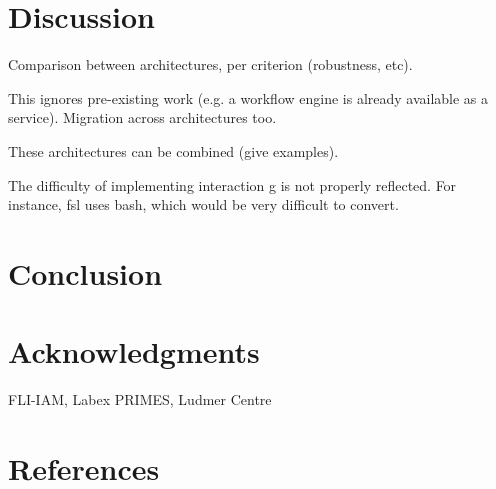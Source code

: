 \documentclass[preprint,3p,twocolumn]{elsarticle}
\begin{document}
\section{Discussion}

Comparison between architectures, per criterion (robustness, etc).

This ignores pre-existing work (e.g. a workflow engine is already available as a service). Migration across architectures too.

These architectures can be combined (give examples). 

The difficulty of implementing interaction g is not properly
reflected. For instance, fsl uses bash, which would be very difficult to convert.

\section{Conclusion}

\section{Acknowledgments}

FLI-IAM, Labex PRIMES, Ludmer Centre

\section*{References}

 

\end{document}
